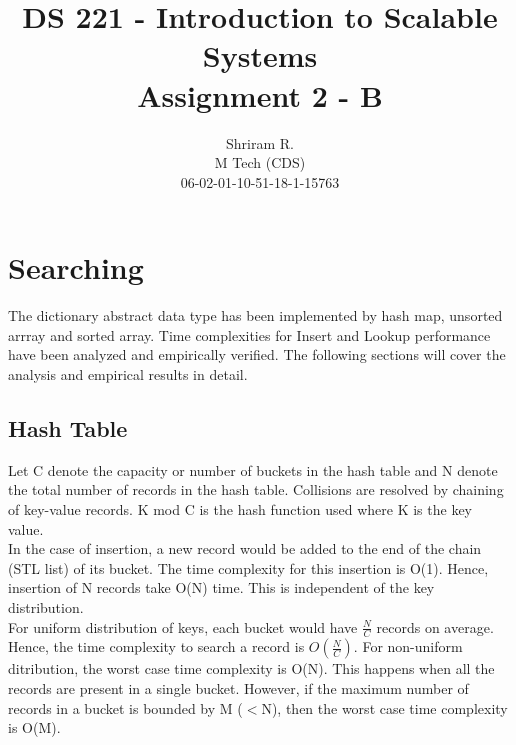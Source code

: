 \documentclass[11pt,a4paper,oneside]{article}
\begin{document}
	\title{DS 221 - Introduction to Scalable Systems \\ Assignment 2 - B}
	\author{Shriram R. \\ M Tech (CDS) \\ 06-02-01-10-51-18-1-15763}
	\maketitle
	
	\section{Searching}
	The dictionary abstract data type has been implemented by hash map, unsorted arrray and sorted array. Time complexities for Insert and Lookup performance have been analyzed and empirically verified. The following sections will cover the analysis and empirical results in detail.
	
	\subsection{Hash Table}
	Let C denote the capacity or number of buckets in the hash table and N denote the total number of records in the hash table. Collisions are resolved by chaining of key-value records. K mod C is the hash function used where K is the key value.\\
	\newline
	In the case of insertion, a new record would be added to the end of the chain (STL list) of its bucket. The time complexity for this insertion is O(1). Hence, insertion of N records take O(N) time. This is independent of the key distribution. \\
	\newline
	For uniform distribution of keys, each bucket would have $\frac{N}{C}$ records on average. Hence, the time complexity to search a record is $O(\frac{N}{C})$. For non-uniform ditribution, the worst case time complexity is O(N). This happens when all the records are present in a single bucket. However, if the maximum number of records in a bucket is bounded by M ($<$N), then the worst case time complexity is O(M).
	
\end{document}
